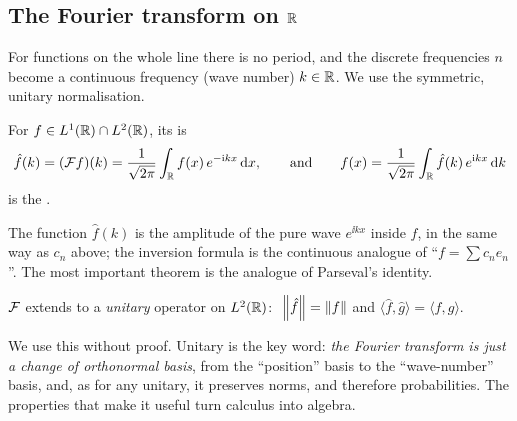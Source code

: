 \subsection{The Fourier transform on $\mathbb{R}$}

For functions on the whole line there is no period, and the discrete frequencies $n$ become a continuous frequency (wave number) $k\in\mathbb{R}$. We use the symmetric, unitary normalisation.

\begin{definition}\label{def:ft}
  For $f\in L^1(\mathbb{R})\cap L^2(\mathbb{R})$, its  is
  \[
    \hat f(k)=(\mathcal{F} f)(k)=\frac1{\sqrt{2\pi}}\int_{\mathbb{R}}f(x)\,e^{-\mathrm{i} kx}\,\mathrm{d} x,
    \qquad\text{and}\qquad
    f(x)=\frac1{\sqrt{2\pi}}\int_{\mathbb{R}}\hat f(k)\,e^{\mathrm{i} kx}\,\mathrm{d} k
  \]
  is the .
\end{definition}

The function $\hat f(k)$ is the amplitude of the pure wave $e^{\ii kx}$ inside $f$, in the same way as $c_n$ above; the inversion formula is the continuous analogue of ``$f=\sum c_ne_n$''. The most important theorem is the analogue of Parseval's identity.

\begin{theorem}[Plancherel]\label{thm:plancherel}
  $\mathcal{F}$ extends to a \emph{unitary} operator on $L^2(\mathbb{R})$: $\ \left\|\hat f\right\|=\left\|f\right\|$ and $\langle\hat f,\hat g\rangle=\langle f,g\rangle$.
\end{theorem}

We use this without proof. Unitary is the key word: \emph{the Fourier transform is just a change of orthonormal basis}, from the ``position'' basis to the ``wave-number'' basis, and, as for any unitary, it preserves norms, and therefore probabilities.
The properties that make it useful turn calculus into algebra.

